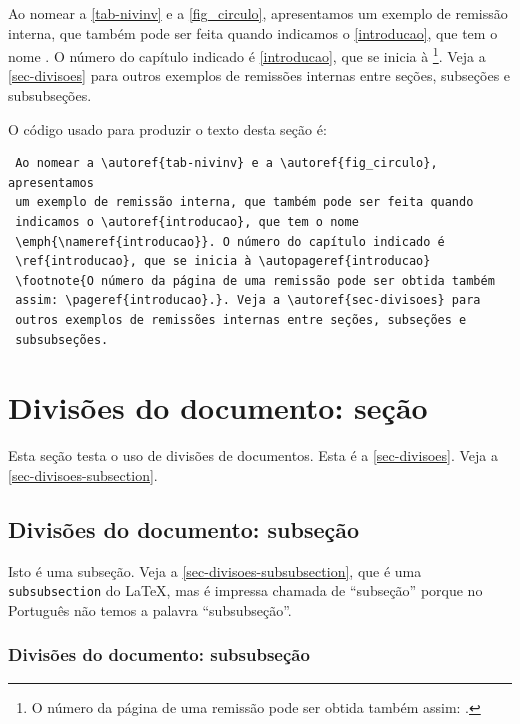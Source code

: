 \documentclass[12pt,oneside,a4paper,chapter=TITLE,english,brazil]{abntex2}
\begin{document}
\begin{anexosenv}
Ao nomear a \autoref{tab-nivinv} e a \autoref{fig_circulo}, apresentamos um exemplo de remissão interna, que também pode ser feita quando indicamos o \autoref{introducao}, que tem o nome \emph{}. O número do capítulo indicado é \ref{introducao}, que se inicia à \footnote{O número da página de uma remissão pode ser obtida também assim: \pageref{introducao}.}. Veja a \autoref{sec-divisoes} para outros exemplos de remissões internas entre seções, subseções e subsubseções.

O código usado para produzir o texto desta seção é:
\begin{verbatim}
 Ao nomear a \autoref{tab-nivinv} e a \autoref{fig_circulo}, apresentamos
 um exemplo de remissão interna, que também pode ser feita quando
 indicamos o \autoref{introducao}, que tem o nome
 \emph{\nameref{introducao}}. O número do capítulo indicado é
 \ref{introducao}, que se inicia à \autopageref{introducao}
 \footnote{O número da página de uma remissão pode ser obtida também
 assim: \pageref{introducao}.}. Veja a \autoref{sec-divisoes} para
 outros exemplos de remissões internas entre seções, subseções e 
 subsubseções.
\end{verbatim}

\section{Divisões do documento: seção}\label{sec-divisoes}

Esta seção testa o uso de divisões de documentos. Esta é a \autoref{sec-divisoes}. Veja a \autoref{sec-divisoes-subsection}.

\subsection{Divisões do documento: subseção}\label{sec-divisoes-subsection}

Isto é uma subseção. Veja a \autoref{sec-divisoes-subsubsection}, que é uma \texttt{subsubsection} do \LaTeX, mas é impressa chamada de ``subseção'' porque no Português não temos a palavra ``subsubseção''.

\subsubsection{Divisões do documento: subsubseção}
\label{sec-divisoes-subsubsection}


\end{anexosenv}
\end{document}
